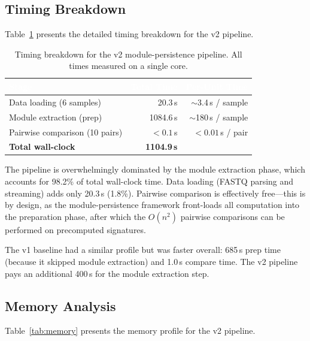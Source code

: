 \documentclass{../yalumba}
\begin{document}
\subsection{Timing Breakdown}

Table~\ref{tab:timing} presents the detailed timing breakdown for the v2
pipeline.

\begin{table}[htbp]
\centering
\tablestyle
\caption{Timing breakdown for the v2 module-persistence pipeline.
  All times measured on a single core.}
\label{tab:timing}
\begin{tabular}{@{}lrr@{}}
\toprule
\rowcolor{table-header}
\textcolor{white}{\textbf{Stage}} &
\textcolor{white}{\textbf{Total Time}} &
\textcolor{white}{\textbf{Per-Unit Time}} \\
\midrule
Data loading (6 samples)     & 20.3\,s   & $\sim$3.4\,s / sample \\
Module extraction (prep)     & 1084.6\,s & $\sim$180\,s / sample \\
Pairwise comparison (10 pairs) & $<0.1$\,s & $<0.01$\,s / pair   \\
\midrule
\textbf{Total wall-clock}   & \textbf{1104.9\,s} & \\
\bottomrule
\end{tabular}
\end{table}


The pipeline is overwhelmingly dominated by the module extraction phase, which
accounts for 98.2\% of total wall-clock time.  Data loading (FASTQ parsing and
streaming) adds only 20.3\,s (1.8\%).  Pairwise comparison is effectively
free---this is by design, as the module-persistence framework front-loads all
computation into the preparation phase, after which the $O(n^2)$ pairwise
comparisons can be performed on precomputed signatures.

The v1 baseline had a similar profile but was faster overall: 685\,s prep time
(because it skipped module extraction) and 1.0\,s compare time.  The v2
pipeline pays an additional 400\,s for the module extraction step.

\subsection{Memory Analysis}

Table~\ref{tab:memory} presents the memory profile for the v2 pipeline.
\end{document}
